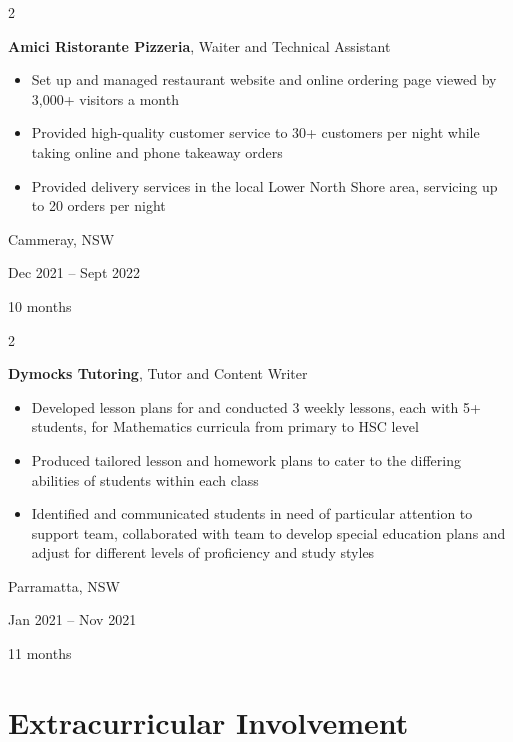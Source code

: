 \documentclass[10pt, a4paper]{article}
\newenvironment{highlights}{
    \begin{itemize}[
        topsep=0.10 cm,
        parsep=0.10 cm,
        partopsep=0pt,
        itemsep=0pt,
        leftmargin=0.4 cm + 10pt
    ]
}{
    \end{itemize}
} %
\newenvironment{twocolentry}[2][]{
    \onecolentry
    \def\secondColumn{#2}
    \setcolumnwidth{\fill, 4.5 cm}
    \begin{paracol}{2}
}{
    \switchcolumn \raggedleft \secondColumn
    \end{paracol}
    \endonecolentry
} %
\begin{document}
        \vspace{0.2 cm}

        \begin{twocolentry}{
            Cammeray, NSW

        Dec 2021 – Sept 2022

        10 months
        }
            \textbf{Amici Ristorante Pizzeria}, Waiter and Technical Assistant
            \begin{highlights}
                \item Set up and managed restaurant website and online ordering page viewed by 3,000+ visitors a month
                \item Provided high-quality customer service to 30+ customers per night while taking online and phone takeaway orders
                \item Provided delivery services in the local Lower North Shore area, servicing up to 20 orders per night
            \end{highlights}
        \end{twocolentry}


        \vspace{0.2 cm}

        \begin{twocolentry}{
            Parramatta, NSW

        Jan 2021 – Nov 2021

        11 months
        }
            \textbf{Dymocks Tutoring}, Tutor and Content Writer
            \begin{highlights}
                \item Developed lesson plans for and conducted 3 weekly lessons, each with 5+ students, for Mathematics curricula from primary to HSC level
                \item Produced tailored lesson and homework plans to cater to the differing abilities of students within each class
                \item Identified and communicated students in need of particular attention to support team, collaborated with team to develop special education plans and adjust for different levels of proficiency and study styles
            \end{highlights}
        \end{twocolentry}



    
    \section{Extracurricular Involvement}
\end{document}
